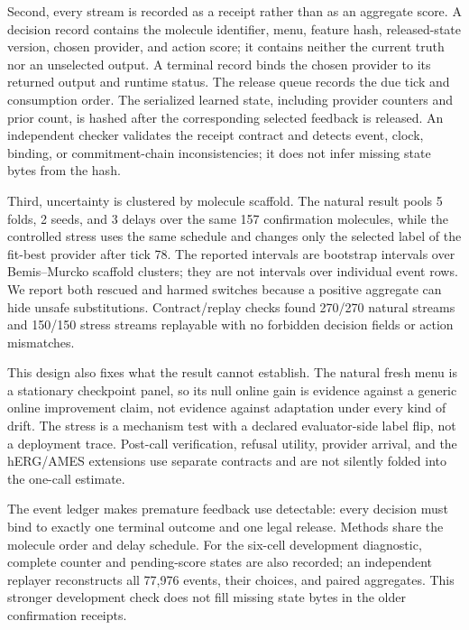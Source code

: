 \documentclass[sigconf,anonymous]{aamas}
\begin{document}
Second, every stream is recorded as a receipt rather than as an aggregate score. A decision record contains the molecule identifier, menu, feature hash, released-state version, chosen provider, and action score; it contains neither the current truth nor an unselected output. A terminal record binds the chosen provider to its returned output and runtime status. The release queue records the due tick and consumption order. The serialized learned state, including provider counters and prior count, is hashed after the corresponding selected feedback is released. An independent checker validates the receipt contract and detects event, clock, binding, or commitment-chain inconsistencies; it does not infer missing state bytes from the hash.

Third, uncertainty is clustered by molecule scaffold. The natural result pools 5 folds, 2 seeds, and 3 delays over the same 157 confirmation molecules, while the controlled stress uses the same schedule and changes only the selected label of the fit-best provider after tick 78. The reported intervals are bootstrap intervals over Bemis--Murcko scaffold clusters; they are not intervals over individual event rows. We report both rescued and harmed switches because a positive aggregate can hide unsafe substitutions. Contract/replay checks found 270/270 natural streams and 150/150 stress streams replayable with no forbidden decision fields or action mismatches.

This design also fixes what the result cannot establish. The natural fresh menu is a stationary checkpoint panel, so its null online gain is evidence against a generic online improvement claim, not evidence against adaptation under every kind of drift. The stress is a mechanism test with a declared evaluator-side label flip, not a deployment trace. Post-call verification, refusal utility, provider arrival, and the hERG/AMES extensions use separate contracts and are not silently folded into the one-call estimate.

The event ledger makes premature feedback use detectable: every decision must bind to exactly one terminal outcome and one legal release. Methods share the molecule order and delay schedule. For the six-cell development diagnostic, complete counter and pending-score states are also recorded; an independent replayer reconstructs all 77,976 events, their choices, and paired aggregates. This stronger development check does not fill missing state bytes in the older confirmation receipts.
\end{document}
